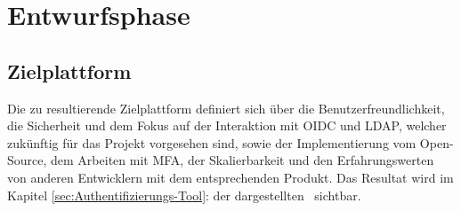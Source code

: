 \section{Entwurfsphase} 
\label{sec:Entwurfsphase}

\subsection{Zielplattform}
\label{sec:Zielplattform}
Die zu resultierende Zielplattform definiert sich über die Benutzerfreundlichkeit, die Sicherheit und dem Fokus auf der Interaktion 
mit \acs*{OIDC} und \acs*{LDAP}, welcher zukünftig für das Projekt vorgesehen sind, sowie der Implementierung vom Open-Source, dem Arbeiten mit MFA, 
der Skalierbarkeit und den Erfahrungswerten von anderen Entwicklern mit dem entsprechenden Produkt. Das Resultat wird im Kapitel 
\ref{sec:Authentifizierungs-Tool}:  der dargestellten~ sichtbar.


